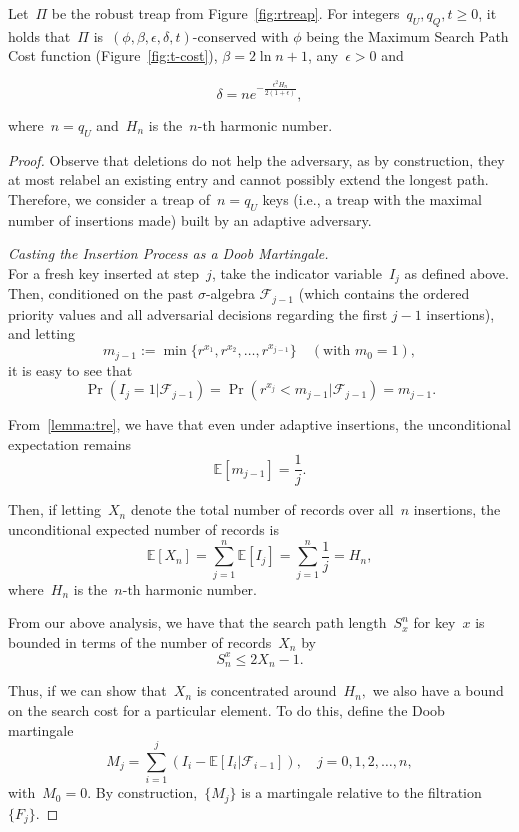 \begin{theorem}\label{thm:tsb}
Let~$\Pi$ be the robust treap from Figure~\ref{fig:rtreap}. For integers~$q_U,q_Q,t \geq 0$, it holds that~$\Pi$ is~$(\phi,\beta,\epsilon,\delta,t)$-conserved with $\phi$ being the Maximum Search Path Cost function (Figure~\ref{fig:t-cost}), $\beta = 2\ln n + 1$, any~$\epsilon > 0$ and 
    
   $$\delta = n e^{-\frac{\epsilon^2 H_{n}}{2(1 + \epsilon)}},$$

where~$n=q_U$ and~$H_n$ is the~$n\text{-th}$ harmonic number.
\end{theorem}

\begin{proof}
Observe that deletions do not help the adversary, as by construction, they at most relabel an existing entry and cannot possibly extend the longest path. Therefore, we consider a treap of~$n=q_U$ keys (i.e., a treap with the maximal number of insertions made) built by an adaptive adversary.  

\textit{Casting the Insertion Process as a Doob Martingale.}\\
For a fresh key inserted at step~$j$, take the indicator variable~$I_j$ as defined above. Then, conditioned on the past $\sigma$-algebra $\mathcal{F}_{j-1}$ (which contains the ordered priority values and all adversarial decisions regarding the first $j-1$ insertions), and letting
$$m_{j-1} := \min\{r^{x_1}, r^{x_2}, \ldots, r^{x_{j-1}}\} \quad (\text{with } m_0 = 1),$$
it is easy to see that
$$\Pr(I_j = 1 | \mathcal{F}_{j-1}) = \Pr(r^{x_{j}} < m_{j-1} | \mathcal{F}_{j-1}) = m_{j-1}.$$

From~\cref{lemma:tre}, we have that even under adaptive insertions, the unconditional expectation remains
$$\mathbb{E}[m_{j-1}] = \frac{1}{j}.$$

Then, if letting~$X_n$ denote the total number of records over all~$n$ insertions, the unconditional expected number of records is
$$\mathbb{E}[X_n] = \sum_{j=1}^{n} \mathbb{E}[I_j] =  \sum_{j=1}^{n} \frac{1}{j} = H_n,$$
where~$H_n$ is the~$n\text{-th}$ harmonic number. 

From our above analysis, we have that the search path length~$S^{n}_x$ for key~$x$ is bounded in terms of the number of records~$X_n$ by
$$S_{n}^x \leq 2X_n -1.$$ 

Thus, if we can show that~$X_n$ is concentrated around~$H_n,$ we also have a bound on the search cost for a particular element. To do this, define the Doob martingale
$$M_j = \sum_{i=1}^{j} (I_i - \mathbb{E}[I_i | \mathcal{F}_{i-1}]), \quad j=0,1,2,\ldots,n,$$
with~$M_0=0.$ By construction,~$\{M_j\}$ is a martingale relative to the filtration~$\{F_j\}$. 


\end{proof}
